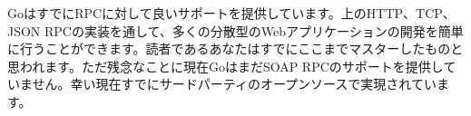GoはすでにRPCに対して良いサポートを提供しています。上のHTTP、TCP、JSON RPCの実装を通して、多くの分散型のWebアプリケーションの開発を簡単に行うことができます。読者であるあなたはすでにここまでマスターしたものと思われます。ただ残念なことに現在GoはまだSOAP RPCのサポートを提供していません。幸い現在すでにサードパーティのオープンソースで実現されています。
